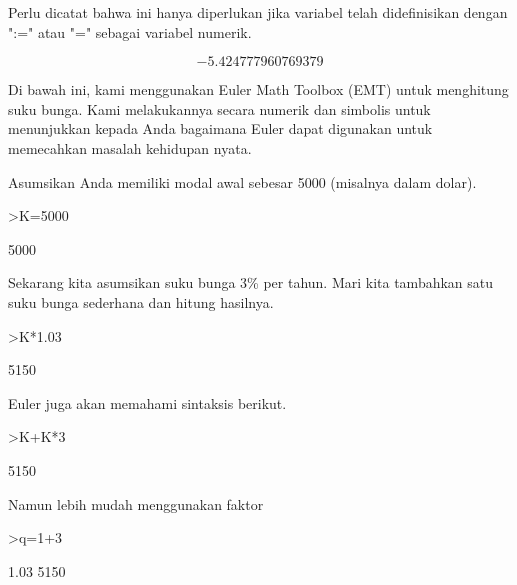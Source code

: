 \documentclass[a4paper,10pt]{article}
\begin{document}
\begin{eulernotebook}
\begin{eulercomment}
\begin{eulercomment}
\begin{eulercomment}
\begin{eulercomment}
\begin{eulercomment}
\begin{eulercomment}
\begin{eulercomment}
Perlu dicatat bahwa ini hanya diperlukan jika variabel telah
didefinisikan dengan ":=" atau "=" sebagai variabel numerik.
\end{eulercomment}
\begin{eulerformula}
\[
-5.424777960769379
\]
\end{eulerformula}
\begin{eulercomment}
Di bawah ini, kami menggunakan Euler Math Toolbox (EMT) untuk
menghitung suku bunga. Kami melakukannya secara numerik dan simbolis
untuk menunjukkan kepada Anda bagaimana Euler dapat digunakan untuk
memecahkan masalah kehidupan nyata.

Asumsikan Anda memiliki modal awal sebesar 5000 (misalnya dalam
dolar).
\end{eulercomment}
\begin{eulerprompt}
>K=5000
\end{eulerprompt}
\begin{euleroutput}
  5000
\end{euleroutput}
\begin{eulercomment}
Sekarang kita asumsikan suku bunga 3\% per tahun. Mari kita tambahkan
satu suku bunga sederhana dan hitung hasilnya.
\end{eulercomment}
\begin{eulerprompt}
>K*1.03
\end{eulerprompt}
\begin{euleroutput}
  5150
\end{euleroutput}
\begin{eulercomment}
Euler juga akan memahami sintaksis berikut.
\end{eulercomment}
\begin{eulerprompt}
>K+K*3%
\end{eulerprompt}
\begin{euleroutput}
  5150
\end{euleroutput}
\begin{eulercomment}
Namun lebih mudah menggunakan faktor
\end{eulercomment}
\begin{eulerprompt}
>q=1+3%
\end{eulerprompt}
\begin{euleroutput}
  1.03
  5150
\end{euleroutput}
\begin{eulercomment}

\end{eulercomment}
\end{eulercomment}
\end{eulercomment}
\end{eulercomment}
\end{eulercomment}
\end{eulercomment}
\end{eulercomment}
\end{eulernotebook}
\end{document}
